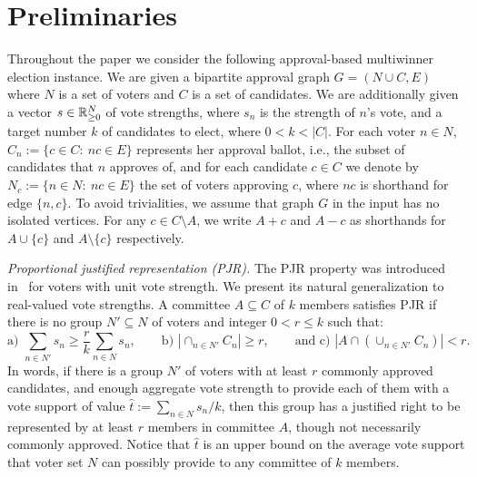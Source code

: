 \section{Preliminaries}\label{s:prel}

Throughout the paper we consider the following approval-based multiwinner election instance. 
We are given a bipartite approval graph $G=(N\cup C, E)$ where $N$ is a set of voters and $C$ is a set of candidates. 
We are additionally given a vector $s\in\mathbb{R}_{\geq 0}^N$ of vote strengths, where $s_n$ is the strength of $n$'s vote, and a target number $k$ of candidates to elect, where $0< k<|C|$.
For each voter $n\in N$, $C_n:=\{c\in C: \ nc\in E\}$ represents her approval ballot, i.e., the subset of candidates that $n$ approves of, and for each candidate $c\in C$ we denote by $N_c:=\{n\in N: \ nc\in E\}$ the set of voters approving $c$, where $nc$ is shorthand for edge $\{n,c\}$. 
To avoid trivialities, we assume that graph $G$ in the input has no isolated vertices. 
For any $c\in C\setminus A$, we write $A+c$ and $A-c$ as shorthands for $A\cup\{c\}$ and $A\setminus \{c\}$ respectively. 

\emph{Proportional justified representation (PJR).} 
The PJR property was introduced in~\cite{sanchez2017proportional} for voters with unit vote strength. We present its natural generalization to real-valued vote strengths. A committee $A\subseteq C$ of $k$ members satisfies PJR if there is no group $N'\subseteq N$ of voters and integer $0<r\leq k$ such that:
%
$$\text{a) } \sum_{n\in N'} s_n \geq \frac{r}{k} \sum_{n\in N}s_n, \quad \quad \text{b) } |\cap_{n\in N'} C_n|\geq r, 
\quad \quad \text{and c) } |A\cap (\cup_{n\in N'} C_n)|<r.$$
%
In words, if there is a group $N'$ of voters with at least $r$ commonly approved candidates, and enough aggregate vote strength to provide each of them with a vote support of value $\hat{t}:=\sum_{n\in N} s_n / k$, then this group has a justified right to be represented by at least $r$ members in committee $A$, though not necessarily commonly approved. 
Notice that $\hat{t}$ is an upper bound on the average vote support that voter set $N$ can possibly provide to any committee of $k$ members. 

